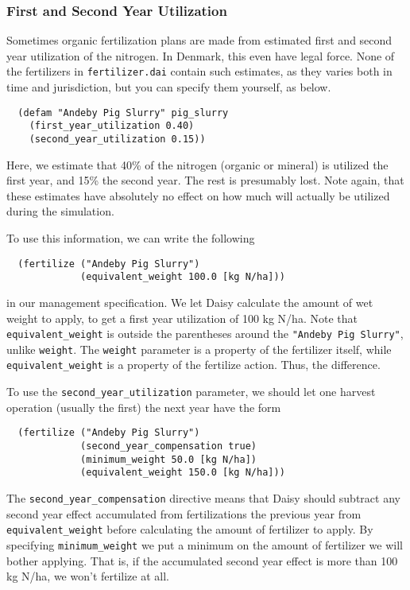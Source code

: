 \documentclass[a4paper]{article}
\begin{document}
\subsubsection{First and Second Year Utilization}

Sometimes organic fertilization plans are made from estimated first
and second year utilization of the nitrogen.  In Denmark, this even
have legal force.  None of the fertilizers in \texttt{fertilizer.dai}
contain such estimates, as they varies both in time and jurisdiction,
but you can specify them yourself, as below.
\begin{verbatim}
  (defam "Andeby Pig Slurry" pig_slurry
    (first_year_utilization 0.40)
    (second_year_utilization 0.15))
\end{verbatim}
Here, we estimate that 40\% of the nitrogen (organic or mineral) is
utilized the first year, and 15\% the second year.  The rest is
presumably lost.  Note again, that these estimates have absolutely no
effect on how much will actually be utilized during the simulation.

To use this information, we can write the following
\begin{verbatim}
  (fertilize ("Andeby Pig Slurry")
             (equivalent_weight 100.0 [kg N/ha]))
\end{verbatim}
in our management specification.  We let Daisy calculate the amount
of wet weight to apply, to get a first year utilization of 100 kg
N/ha.  Note that \texttt{equivalent\_weight} is outside the
parentheses around the \texttt{"Andeby Pig Slurry"}, unlike
\texttt{weight}.  The \texttt{weight} parameter is a property of the
fertilizer itself, while \texttt{equivalent\_weight} is a property of
the fertilize action.  Thus, the difference.

To use the \texttt{second\_year\_utilization} parameter, we should let
one harvest operation (usually the first) the next year have the form
\begin{verbatim}
  (fertilize ("Andeby Pig Slurry")
             (second_year_compensation true)
             (minimum_weight 50.0 [kg N/ha])
             (equivalent_weight 150.0 [kg N/ha]))
\end{verbatim}
The \texttt{second\_year\_compensation} directive means that Daisy
should subtract any second year effect accumulated from fertilizations
the previous year from \texttt{equivalent\_weight} before calculating
the amount of fertilizer to apply.  By specifying
\texttt{minimum\_weight} we put a minimum on the amount of fertilizer
we will bother applying.  That is, if the accumulated second year
effect is more than 100 kg N/ha, we won't fertilize at all.
\end{document}
